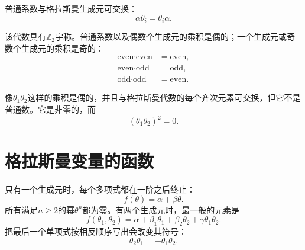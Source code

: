 普通系数与格拉斯曼生成元可交换：
\begin{equation}
\alpha\theta_i=\theta_i\alpha.
\end{equation}

\begin{classroomqa}
\end{classroomqa}

该代数具有\(\mathbb Z_2\)宇称。普通系数以及偶数个生成元的乘积是偶的；一个生成元或奇数个生成元的乘积是奇的：
\begin{equation}
\begin{aligned}
\text{even}\cdot\text{even}&=\text{even},\\
\text{even}\cdot\text{odd}&=\text{odd},\\
\text{odd}\cdot\text{odd}&=\text{even}.
\end{aligned}
\end{equation}

\begin{classroomqa}
\end{classroomqa}

像\(\theta_1\theta_2\)这样的乘积是偶的，并且与格拉斯曼代数的每个齐次元素可交换，但它不是普通数。它是非零的，而
\begin{equation}
(\theta_1\theta_2)^2=0.
\end{equation}

\begin{classroomqa}
\end{classroomqa}

\section{格拉斯曼变量的函数}

只有一个生成元时，每个多项式都在一阶之后终止：
\begin{equation}
f(\theta)=\alpha+\beta\theta.
\end{equation}
所有满足\(n\geq2\)的幂\(\theta^n\)都为零。有两个生成元时，最一般的元素是
\begin{equation}
f(\theta_1,\theta_2)
=\alpha+\beta_1\theta_1+\beta_2\theta_2
+\gamma\theta_1\theta_2.
\end{equation}
把最后一个单项式按相反顺序写出会改变其符号：
\begin{equation}
\theta_2\theta_1=-\theta_1\theta_2.
\end{equation}

